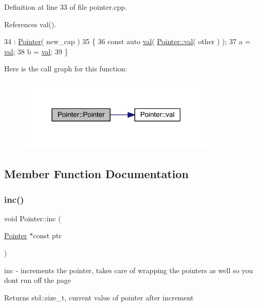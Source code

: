 Definition at line 33 of file pointer.\+cpp.



References val().


\begin{DoxyCode}
34                                             : \hyperlink{class_pointer_ae124185327ebd4938437141a6aec7ede}{Pointer}( new\_cap )
35 \{
36    \textcolor{keyword}{const} \textcolor{keyword}{auto} \hyperlink{class_pointer_a27de62075753297225ad8217ba123307}{val}(  \hyperlink{class_pointer_a27de62075753297225ad8217ba123307}{Pointer::val}( other ) );
37    a = \hyperlink{class_pointer_a27de62075753297225ad8217ba123307}{val};
38    b = \hyperlink{class_pointer_a27de62075753297225ad8217ba123307}{val};
39 \}
\end{DoxyCode}
Here is the call graph for this function\+:
\nopagebreak
\begin{figure}[H]
\begin{center}
\leavevmode
\includegraphics[width=267pt]{class_pointer_a94c66784ca4f1f69be6feac9d8ecc7f2_cgraph}
\end{center}
\end{figure}


\subsection{Member Function Documentation}
\hypertarget{class_pointer_adc3754145e0b7a506ce0ad41732963c5}{}\label{class_pointer_adc3754145e0b7a506ce0ad41732963c5} 
\subsubsection{\texorpdfstring{inc()}{inc()}}
{\footnotesize\ttfamily void Pointer\+::inc (\begin{DoxyParamCaption}\item[{\hyperlink{class_pointer}{Pointer} $\ast$const}]{ptr }\end{DoxyParamCaption})\hspace{0.3cm}{\ttfamily [static]}}

inc -\/ increments the pointer, takes care of wrapping the pointers as well so you don\textquotesingle{}t run off the page \begin{DoxyReturn}{Returns}
std\+::size\+\_\+t, current value of pointer after increment 
\end{DoxyReturn}


